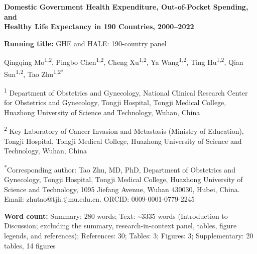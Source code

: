\documentclass[12pt,a4paper]{article}
\begin{document}
\linenumbers


\begin{center}
\Large\textbf{Domestic Government Health Expenditure, Out-of-Pocket Spending, and\\Healthy Life Expectancy in 190 Countries, 2000--2022}

\vspace{12pt}
{\small\textbf{Running title:} GHE and HALE: 190-country panel}

\vspace{6pt}
\large Qingqing Mo\textsuperscript{1,2}, Pingbo Chen\textsuperscript{1,2},
Cheng Xu\textsuperscript{1,2}, Ya Wang\textsuperscript{1,2},
Ting Hu\textsuperscript{1,2}, Qian Sun\textsuperscript{1,2},
Tao Zhu\textsuperscript{1,2*}

\vspace{6pt}
\normalsize
\textsuperscript{1} Department of Obstetrics and Gynecology, National Clinical Research Center
for Obstetrics and Gynecology, Tongji Hospital, Tongji Medical College, Huazhong
University of Science and Technology, Wuhan, China

\textsuperscript{2} Key Laboratory of Cancer Invasion and Metastasis (Ministry of Education),
Tongji Hospital, Tongji Medical College, Huazhong University of Science and Technology,
Wuhan, China

\vspace{6pt}
\textsuperscript{*}Corresponding author: Tao Zhu, MD, PhD, Department of
Obstetrics and Gynecology, Tongji Hospital, Tongji Medical College, Huazhong
University of Science and Technology, 1095 Jiefang Avenue, Wuhan 430030,
Hubei, China. Email: zhutao@tjh.tjmu.edu.cn. ORCID: 0009-0001-0779-2245
\end{center}

\vspace{6pt}
\textbf{Word count:} Summary: 280 words; Text: \textasciitilde3335 words (Introduction to Discussion; excluding the summary, research-in-context panel, tables, figure legends, and references); References: 30;
Tables: 3; Figures: 3; Supplementary: 20 tables, 14 figures

\end{document}
